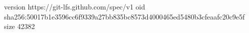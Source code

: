 version https://git-lfs.github.com/spec/v1
oid sha256:50017b1e3596cc6f9339a27bb835bc8573d4000465ed5480b3cfeaafc20c9e5f
size 42382
